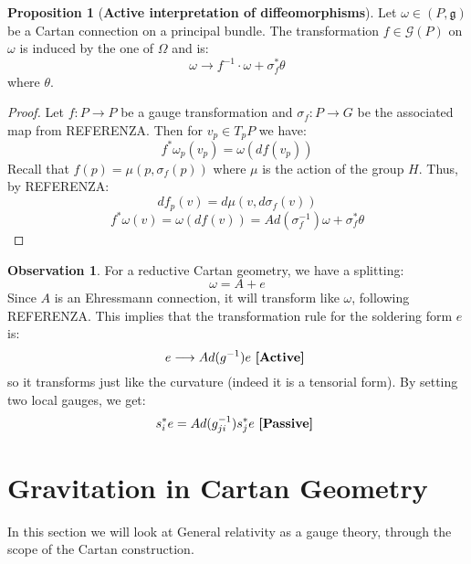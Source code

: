 \documentclass[12pt,a4paper]{report}
\theoremstyle{definition}
\theoremstyle{Theorem}
\newtheorem{Prop}[Def]{Proposition}
\theoremstyle{definition}
\theoremstyle{definition}
\newtheorem{Obs}[Def]{Observation}
\begin{document}
	\begin{Prop} [\textbf{Active interpretation of diffeomorphisms}]
		Let $\omega\in (P,\mathfrak{g})$ be a Cartan connection on a principal bundle. The transformation $f\in\mathcal{G}(P)$ on $\omega$ is induced by the one of $\Omega$ and is:
		$$\omega\rightarrow f^{-1}\cdot \omega+\sigma_f^*\theta$$
		where $\theta$.
	\end{Prop}
	\begin{proof}
		Let $f:P\rightarrow P$ be a gauge transformation and $\sigma_f:P\rightarrow G$ be the associated map from REFERENZA. Then for $v_p\in T_pP$ we have:
		$$f^*\omega_p(v_p)=\omega(df(v_p))$$
		Recall that $f(p)=\mu(p,\sigma_f(p))$ where $\mu$ is the action of the group $H$. Thus, by REFERENZA: 
		$$df_p(v)=d\mu(v,d\sigma_f(v))$$
		$$f^*\omega(v)=\omega(df(v))=Ad(\sigma_f^{-1})\omega+\sigma_f^*\theta$$
	\end{proof}
	\begin{Obs}
		For a reductive Cartan geometry, we have a splitting:
		$$\omega=A+e$$
		Since $A$ is an Ehressmann connection, it will transform like $\omega$, following REFERENZA. This implies that the transformation rule for the soldering form $e$ is:
		$$e\longrightarrow Ad(g^{-1})e\hbox{ \textbf{[Active] }}$$
		so it transforms just like the curvature (indeed it is a tensorial form). By setting two local gauges, we get:
		$$s_i^*e= Ad(g_{ji}^{-1})s_j^*e\hbox{ \textbf{[Passive] }}$$
	\end{Obs}
	\section{Gravitation in Cartan Geometry}
	In this section we will look at General relativity as a gauge theory, through the scope of the Cartan construction.
	
\end{document}
